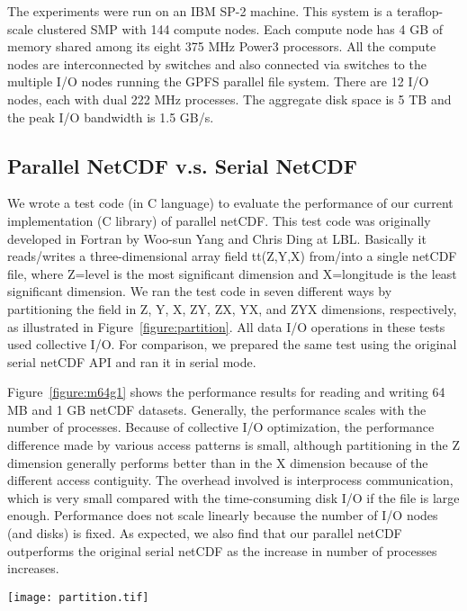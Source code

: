 \documentclass[10pt,twocolumn]{article}          %
\begin{document}
The experiments were run on an IBM SP-2 machine. This system is a teraflop-scale 
clustered SMP with 144 compute nodes. Each compute node has 4
GB of memory shared among its eight 375 MHz Power3 processors. All the compute nodes are
interconnected by switches and also connected via switches to the multiple I/O
nodes running the GPFS parallel file system. There are 12 I/O nodes, each with dual 222 MHz
processes. The aggregate disk space is 5 TB and the peak I/O bandwidth is 1.5 GB/s.

\subsection{Parallel NetCDF v.s. Serial NetCDF}

We wrote a test code (in C language) to evaluate the performance of our current
implementation (C library) of parallel netCDF.
This test code was originally developed in Fortran
by Woo-sun Yang and Chris Ding at LBL. Basically it
reads/writes a three-dimensional array field tt(Z,Y,X) from/into a
single netCDF file, where Z=level is the most significant
dimension and X=longitude is the least
significant dimension. We ran the test code in seven different
ways by partitioning the field in Z, Y, X, ZY, ZX, YX, and ZYX
dimensions, respectively, as illustrated in
Figure~\ref{figure:partition}. All data I/O operations in these
tests used collective I/O. For comparison, we prepared the same
test using the original serial netCDF API and ran it in serial
mode.

Figure~\ref{figure:m64g1} shows the performance results for reading and writing 64 MB and 1
GB netCDF datasets. Generally, the performance scales with the number of processes. Because of
collective I/O optimization, the performance difference made by various access patterns is small,
although partitioning in the Z dimension generally performs better than in the X
dimension because of the different access contiguity. The overhead involved is interprocess
communication, which is very small compared with the time-consuming disk I/O if the file is large
enough. Performance does not scale linearly because the number of I/O nodes (and disks) is fixed.
As expected, we also find that our parallel netCDF outperforms the original serial netCDF 
as the increase in number of processes increases.

\begin{figure*}
\begin{center}
\texttt{[image: partition.tif]}
\end{center}
\vskip -0.1in \caption{Example of Field Array Partitions on 8
Processors} \label{figure:partition}
\end{figure*}
\end{document}
